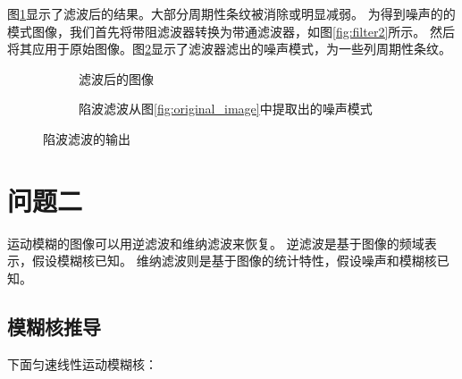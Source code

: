 \documentclass[UTF8]{article}
\begin{document}
图\ref{fig:output}显示了滤波后的结果。大部分周期性条纹被消除或明显减弱。
为得到噪声的的模式图像，我们首先将带阻滤波器转换为带通滤波器，如图\ref{fig:filter2}所示。
然后将其应用于原始图像。图\ref{fig:output2}显示了滤波器滤出的噪声模式，为一些列周期性条纹。
\begin{figure}[htbp]
    \centering
    \begin{subfigure}{0.45\textwidth}
      \centering
      
      \caption{滤波后的图像}
      \label{fig:output}
    \end{subfigure}
    \begin{subfigure}{0.45\textwidth}
      \centering
      
      \caption{陷波滤波从图\ref{fig:original_image}中提取出的噪声模式}
      \label{fig:output2}
    \end{subfigure}
    \caption{陷波滤波的输出}
    \label{fig:outputs} %
\end{figure}
%     
%     
\section{问题二}

    运动模糊的图像可以用逆滤波和维纳滤波来恢复。
    逆滤波是基于图像的频域表示，假设模糊核已知。
    维纳滤波则是基于图像的统计特性，假设噪声和模糊核已知。

\subsection{模糊核推导}
    下面匀速线性运动模糊核：
\end{document}

